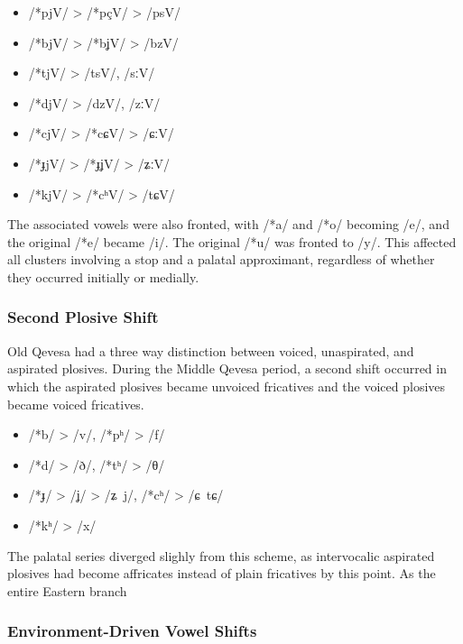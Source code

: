 \documentclass[grammar]{subfiles}
\begin{document}
\begin{itemize}
  \item /*pjV/ > /*pçV/ > /psV/
  \item /*bjV/ > /*bʝV/ > /bzV/
  \item /*tjV/ > /tsV/, /sːV/
  \item /*djV/ > /dzV/, /zːV/
  \item /*cjV/ > /*cɕV/ > /ɕːV/
  \item /*ɟjV/ > /*ɟʝV/ > /ʑːV/
  \item /*kjV/ > /*cʰV/ > /tɕV/
\end{itemize}

The associated vowels were also fronted, with /*a/ and /*o/ becoming /e/, and
the original /*e/ became /i/.  The original /*u/ was fronted to /y/.  This
affected all clusters involving a stop and a palatal approximant, regardless of
whether they occurred initially or medially.


\subsubsection{Second Plosive Shift}
\label{sssec:history:east:second_plosive_shift}

Old Qevesa had a three way distinction between voiced, unaspirated, and
aspirated plosives.  During the Middle Qevesa period, a second shift occurred
in which the aspirated plosives became unvoiced fricatives and the voiced
plosives became voiced fricatives.  

\begin{itemize}
  \item /*b/ > /v/, /*pʰ/ > /f/
  \item /*d/ > /ð/, /*tʰ/ > /θ/
  \item /*ɟ/ > /ʝ/ > /ʑ~j/, /*cʰ/ > /ɕ~tɕ/
  \item /*kʰ/ > /x/
\end{itemize}

The palatal series diverged slighly from this scheme, as intervocalic aspirated
plosives had become affricates instead of plain fricatives by this point.  As the entire Eastern branch 



\subsubsection{Environment-Driven Vowel Shifts}
\label{sssec:history:east:vowel_shifts}
\end{document}
